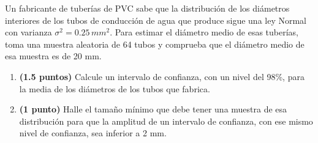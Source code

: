
Un fabricante de tuberías de PVC sabe que la distribución de los diámetros interiores de los tubos de conducción de agua que produce sigue una ley Normal con varianza $\sigma^2=0.25\,mm^2$. Para estimar el diámetro medio de esas tuberías, toma una muestra aleatoria de 64 tubos y comprueba que el diámetro medio de esa muestra es de 20 mm.
\begin{enumerate}[label=\alph*)]
\item \textbf{(1.5 puntos)} Calcule un intervalo de confianza, con un nivel del 98\%, para la media de los diámetros de los tubos que fabrica.
\item \textbf{(1 punto)} Halle el tamaño mínimo que debe tener una muestra de esa distribución para que la amplitud de un intervalo de confianza, con ese mismo nivel de confianza, sea inferior a 2 mm.
\end{enumerate}
